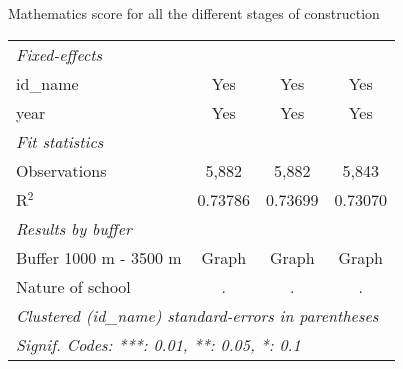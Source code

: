 \documentclass[9pt]{beamer}
\begin{document}
\begin{frame}{Mathematics score for all the different stages of construction}
\begin{center}
\begin{tabular}{lccc}
   \midrule
   \emph{Fixed-effects}\\
   id\_name     & Yes             & Yes            & Yes\\  
   year         & Yes             & Yes            & Yes\\  
   \midrule
   \emph{Fit statistics}\\
   Observations & 5,882           & 5,882          & 5,843\\  
   R$^2$        & 0.73786         & 0.73699        & 0.73070\\  
   \midrule  
   \emph{Results by buffer}\\
   Buffer 1000 m - 3500 m  &  Graph\hyperlink{10p_math_buf}{\beamergotobutton{ }}            &  Graph\hyperlink{50p_math_buf}{\beamergotobutton{}}             &  Graph\hyperlink{100p_math_buf}{\beamergotobutton{}}     \\
    Nature of school &  .\hyperlink{10p_math_nat}{\beamerbutton{ !}}            &  .\hyperlink{50p_math_nat}{\beamerbutton{ !}}             &  .\hyperlink{100p_math_nat}{\beamerbutton{ !}}    \\   
   \midrule  
   \multicolumn{4}{l}{\emph{Clustered (id\_name) standard-errors in parentheses}}\\
   \multicolumn{4}{l}{\emph{Signif. Codes: ***: 0.01, **: 0.05, *: 0.1}}\\
   \midrule
\end{tabular}
 
 
 \end{center}
\end{frame}








\end{document}
